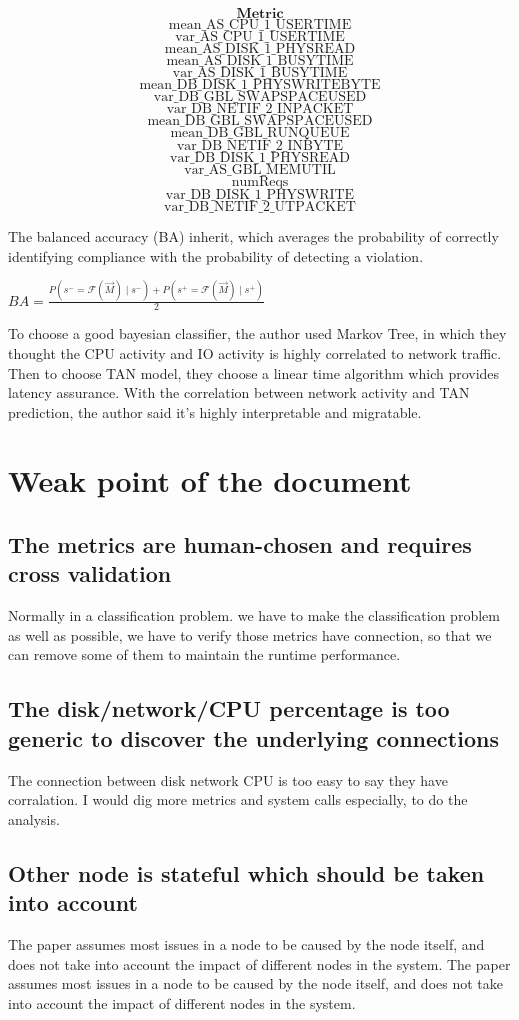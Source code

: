 \documentclass[acmlarge]{acmart}
\begin{document}
$$\textbf{Metric}$$
$$\text{mean\_AS\_CPU\_1\_USERTIME}$$
$$\text{var\_AS\_CPU\_1\_USERTIME}$$
$$\text{mean\_AS\_DISK\_1\_PHYSREAD}$$
$$\text{mean\_AS\_DISK\_1\_BUSYTIME}$$
$$\text{var\_AS\_DISK\_1\_BUSYTIME}$$
$$\text{mean\_DB\_DISK\_1\_PHYSWRITEBYTE}$$
$$\text{var\_DB\_GBL\_SWAPSPACEUSED}$$
$$\text{var\_DB\_NETIF\_2\_INPACKET}$$
$$\text{mean\_DB\_GBL\_SWAPSPACEUSED}$$
$$\text{mean\_DB\_GBL\_RUNQUEUE}$$
$$\text{var\_DB\_NETIF\_2\_INBYTE}$$
$$\text{var\_DB\_DISK\_1\_PHYSREAD}$$
$$\text{var\_AS\_GBL\_MEMUTIL}$$
$$\text{numReqs}$$
$$\text{var\_DB\_DISK\_1\_PHYSWRITE}$$
$$\text{var\_DB\_NETIF\_2\_UTPACKET}$$

The balanced accuracy (BA) inherit, which averages the probability of correctly identifying compliance with the probability of detecting a violation.

$B A=\frac{P\left(s^{-}=\mathcal{F}(\vec{M}) \mid s^{-}\right)+P\left(s^{+}=\mathcal{F}(\vec{M}) \mid s^{+}\right)}{2}$

To choose a good bayesian classifier, the author used Markov Tree, in which they thought the CPU activity and IO activity is highly correlated to network traffic. Then to choose TAN model, they choose a linear time algorithm which provides latency assurance. With the correlation between network activity and TAN prediction, the author said it's highly interpretable and migratable.
\section{Weak point of the document}
\subsection{The metrics are human-chosen and requires cross validation}
Normally in a classification problem. we have to make the classification problem as well as possible, we have to verify those metrics have connection, so that we can remove some of them to maintain the runtime performance.
\subsection{The disk/network/CPU percentage is too generic to discover the underlying connections}
The connection between disk network CPU is too easy to say they have corralation. I would dig more metrics and system calls especially, to do the analysis.
\subsection{Other node is stateful which should be taken into account}The paper assumes most issues in a node to be caused by the node itself, and does not take into account the impact of different nodes in the system.
The paper assumes most issues in a node to be caused by the node itself, and does not take into account the impact of different nodes in the system.
\end{document}
